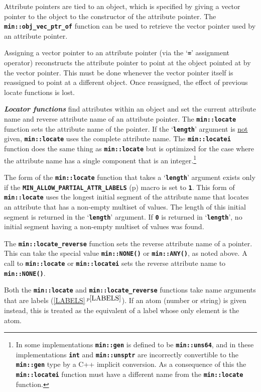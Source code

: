 \documentclass[12pt]{article}
\newcommand{\TT}[1]{{\tt \bfseries #1}}
\newcommand{\ikey}[2]{{\bf \em #1}\index{#2}}
\newcommand{\itemref}[1]{\ref{#1}$\,^{p\pageref{#1}}$}
\newcommand{\pagref}[1]{p\pageref{#1}}
\newcommand{\EOL}{\penalty \exhyphenpenalty}
\begin{document}
Attribute pointers are tied to an object, which is specified by
giving a vector pointer to the object to the constructor of the
attribute pointer.  The \TT{min::\EOL obj\_\EOL vec\_\EOL ptr\_\EOL of}
function can be used to retrieve the vector pointer used by
an attribute pointer.

Assigning a vector pointer to an attribute pointer
(via the `\TT{=}' assignment operator) reconstructs the
attribute pointer to point at the object pointed at by the vector
pointer.  This must be done whenever the vector pointer itself
is reassigned to point at a different object.  Once reassigned,
the effect of previous locate functions is lost.

\ikey{Locator functions}{locator function}
find attributes within an object and set the current
attribute name and reverse attribute name of an attribute pointer.
The \TT{min::\EOL locate} function sets the attribute name of the pointer.
If the `\TT{length}' argument is \underline{not} given, \TT{min::\EOL locate}
uses the complete attribute name.
The \TT{min::\EOL locatei} function does the
same thing as \TT{min::\EOL locate}
but is optimized for the case where the attribute
name has a single component that is an integer.\footnote{
In some implementations \TT{min::gen} is defined to be \TT{min::uns64},
and in these implementations \TT{int} and \TT{min::unsptr} are
incorrectly convertible to the
\TT{min::gen} type by a C++ implicit conversion.  As a consequence of this
the \TT{min::\EOL locatei} function must have a different name from the
\TT{min::\EOL locate} function.}

The form of the \TT{min::\EOL locate} function that takes a `\TT{length}'
argument exists only if the
\TT{MIN\_\EOL ALLOW\_\EOL PARTIAL\_\EOL ATTR\_\EOL LABELS}
(\pagref{MIN_ALLOW_PARTIAL_ATTR_LABELS}) macro is set to \TT{1}.
This form of \TT{min::\EOL locate} uses the longest initial segment of the
attribute name that locates an attribute that has a non-empty
multiset of values.  The
length of this initial segment is returned in the `\TT{length}'
argument.  If \TT{0} is returned in `\TT{length}',
no initial segment having a non-empty multiset of values was found.

The \TT{min::\EOL locate\_reverse} function sets the reverse attribute name of
a pointer.  This can take the special value \TT{min::NONE()} or
\TT{min::ANY()}, as noted above.  A call to \TT{min::\EOL locate} or
\TT{min::\EOL locatei} sets the
reverse attribute name to \TT{min::NONE()}.

Both the \TT{min::\EOL locate} and \TT{min::\EOL locate\_reverse}
functions take name
arguments that are labels (\itemref{LABELS}).  If an atom (number or
string) is given instead, this is treated as the equivalent of
a label whose only element is the atom.
\end{document}
